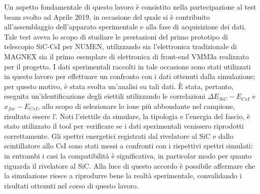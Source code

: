 Un aspetto fondamentale di questo lavoro è consistito nella partecipazione al test beam svolto ad Aprile 2019, in occasione del quale si è contribuito all'assemblaggio dell'apparato sperimentale e alla fase di acquisizione dei dati.
Tale test aveva lo scopo di studiare le prestazioni del primo prototipo di telescopio SiC-CsI per NUMEN, utilizzando sia l'elettronica tradizionale di MAGNEX sia il primo esemplare di elettronica di front-end VMM3a realizzato per il progetto.
I dati sperimentali raccolti in tale occasione sono stati utilizzati in questo lavoro per effettuare un confronto con i dati ottenuti dalla simulazione; per questo motivo, è stata svolta un'analisi su tali dati.
È stata, pertanto, eseguita un'identificazione degli eiettili utilizzando le correlazioni $\Delta E_{SiC} -E_{CsI}$ e $x_{foc} -E_{CsI}$, allo scopo di selezionare lo ione più abbondante nel campione, risultato essere l'.
Noti l'eiettile da simulare, la tipologia e l'energia del fascio, è stato utilizzato il tool per verificare se i dati sperimentali venissero riprodotti correttamente.
Gli spettri energetici registrati dal rivelatore al SiC e dallo scintillatore allo CsI sono stati messi a confronti con i rispettivi spettri simulati: in entrambi i casi la compatibilità è significativa, in particolar modo per quanto riguarda il rivelatore al SiC.
Alla luce di questo accordo è possibile affermare che la simulazione riesce a riprodurre bene la realtà sperimentale, convalidando i risultati ottenuti nel corso di questo lavoro.





